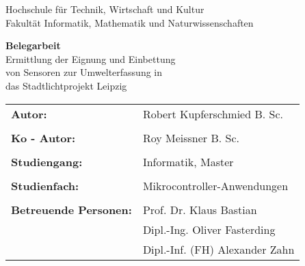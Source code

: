 \begin{titlepage}
\vspace{4cm}
\begin{center}
Hochschule für Technik, Wirtschaft und Kultur\\
Fakultät Informatik, Mathematik und Naturwissenschaften 
\vspace{5cm}

\huge{\textbf{Belegarbeit}}\\
\normalsize
\vspace{1cm}
Ermittlung der Eignung und Einbettung \\von Sensoren zur Umwelterfassung in \\das Stadtlichtprojekt Leipzig
\\
\vspace{\fill}
\end{center}

\begin{flushleft}
\begin{tabular}{p{} p{}}
 \textbf{Autor:} & Robert Kupferschmied B. Sc.  \\ 
 & \\
 \textbf{Ko - Autor:} & Roy Meissner B. Sc.  \\
 & \\
 \textbf{Studiengang:} & Informatik, Master \\ 
 & \\
 \textbf{Studienfach:} & Mikrocontroller-Anwendungen \\ 
 & \\
 \textbf{Betreuende Personen:} & Prof. Dr. Klaus Bastian \\
 & Dipl.-Ing. Oliver Fasterding \\
 & Dipl.-Inf. (FH) Alexander Zahn \\
\end{tabular} 
\end{flushleft}

\end{titlepage}
